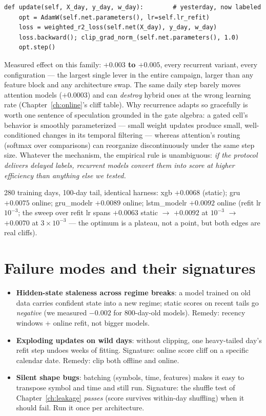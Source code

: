 \begin{lstlisting}
def update(self, X_day, y_day, w_day):        # yesterday, now labeled
    opt = AdamW(self.net.parameters(), lr=self.lr_refit)
    loss = weighted_r2_loss(self.net(X_day), y_day, w_day)
    loss.backward(); clip_grad_norm_(self.net.parameters(), 1.0)
    opt.step()
\end{lstlisting}

Measured effect on this family: \textbf{$+0.003$ to $+0.005$}, every
recurrent variant, every configuration --- the largest single lever in the
entire campaign, larger than any feature block and any architecture swap.
The same daily step barely moves attention models ($+0.0003$) and can
\emph{destroy} hybrid ones at the wrong learning rate
(Chapter~\ref{ch:online}'s cliff table). Why recurrence adapts so
gracefully is worth one sentence of speculation grounded in the gate
algebra: a gated cell's behavior is smoothly parameterized --- small weight
updates produce small, well-conditioned changes in its temporal filtering
--- whereas attention's routing (softmax over comparisons) can reorganize
discontinuously under the same step size. Whatever the mechanism, the
empirical rule is unambiguous: \emph{if the protocol delivers delayed
labels, recurrent models convert them into score at higher efficiency than
anything else we tested.}

\begin{jsbox}
280 training days, 100-day tail, identical harness:
xgb $+0.0068$ (static);
gru $+0.0075$ online;
gru\_modelr $+0.0089$ online;
lstm\_modelr $+0.0092$ online (refit lr $10^{-3}$; the sweep over refit
lr spans $+0.0063$ static $\to$ $+0.0092$ at $10^{-3}$ $\to$ $+0.0070$ at
$3\times10^{-3}$ --- the optimum is a plateau, not a point, but both
edges are real cliffs).
\end{jsbox}

\section{Failure modes and their signatures}

\begin{itemize}
\item \textbf{Hidden-state staleness across regime breaks}: a model
  trained on old data carries confident state into a new regime; static
  scores on recent tails go \emph{negative} (we measured $-0.002$ for
  800-day-old models). Remedy: recency windows + online refit, not bigger
  models.
\item \textbf{Exploding updates on wild days}: without clipping, one
  heavy-tailed day's refit step undoes weeks of fitting. Signature: online
  score cliff on a specific calendar date. Remedy: clip both offline and
  online.
\item \textbf{Silent shape bugs}: batching (symbols, time, features) makes
  it easy to transpose symbol and time and still run. Signature: the
  shuffle test of Chapter~\ref{ch:leakage} \emph{passes} (score survives
  within-day shuffling) when it should fail. Run it once per architecture.
\end{itemize}

